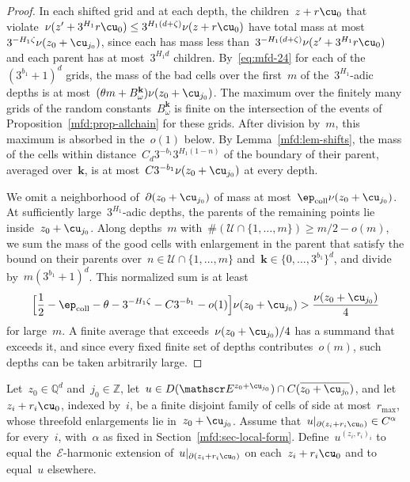 \documentclass[11pt]{amsart}
\begin{document}
\begin{proof}
In each shifted grid and at each depth, the children~$z+r\cu_0$ that violate~$\nu(z'+3^{H_1}r\cu_0)\leq3^{H_1(d+\zeta)}\nu(z+r\cu_0)$ have total mass at most~$3^{-H_1\zeta}\nu(z_0+\cu_{j_0})$, since each has mass less than~$3^{-H_1(d+\zeta)}\nu(z'+3^{H_1}r\cu_0)$ and each parent has at most~$3^{H_1d}$ children. By~\eqref{eq:mfd-24} for each of the~$(3^{b_1}+1)^d$ grids, the mass of the bad cells over the first~$m$ of the~$3^{H_1}$-adic depths is at most~$(\theta m+B_\omega^{\mathbf k})\nu(z_0+\cu_{j_0})$. The maximum over the finitely many grids of the random constants~$B^{\mathbf k}_\omega$ is finite on the intersection of the events of Proposition~\ref{mfd:prop-allchain} for these grids. After division by~$m$, this maximum is absorbed in the~$o(1)$ below. By Lemma~\ref{mfd:lem-shifts}, the mass of the cells within distance~$C_d3^{-b_1}3^{H_1(1-n)}$ of the boundary of their parent, averaged over~$\mathbf k$, is at most~$C3^{-b_1}\nu(z_0+\cu_{j_0})$ at every depth.

\smallskip

We omit a neighborhood of~$\partial(z_0+\cu_{j_0})$ of mass at most~$\ep_{\rm coll}\nu(z_0+\cu_{j_0})$. At sufficiently large~$3^{H_1}$-adic depths, the parents of the remaining points lie inside~$z_0+\cu_{j_0}$. Along depths~$m$ with~$\#(\mathcal U\cap\{1,\ldots,m\})\geq m/2-o(m)$, we sum the mass of the good cells with enlargement in the parent that satisfy the bound on their parents over~$n\in\mathcal U\cap\{1,\ldots,m\}$ and~$\mathbf k\in\{0,\ldots,3^{b_1}\}^d$, and divide by~$m(3^{b_1}+1)^d$. This normalized sum is at least
\begin{equation*}
	\Bigl[\frac12-\ep_{\rm coll}-\theta-3^{-H_1\zeta}-C3^{-b_1}
	-o(1)\Bigr]\nu(z_0+\cu_{j_0})>\frac{\nu(z_0+\cu_{j_0})}{4}
\end{equation*}
for large~$m$. A finite average that exceeds~$\nu(z_0+\cu_{j_0})/4$ has a summand that exceeds it, and since every fixed finite set of depths contributes~$o(m)$, such depths can be taken arbitrarily large.
\end{proof}

Let~$z_0\in\mathbb Q^d$ and~$j_0\in\mathbb Z$, let~$u\in D(\mathscr E^{z_0+\cu_{j_0}})\cap C(\overline{z_0+\cu_{j_0}})$, and let~$z_i+r_i\cu_0$, indexed by~$i$, be a finite disjoint family of cells of side at most~$r_{\max}$, whose threefold enlargements lie in~$z_0+\cu_{j_0}$. Assume that~$u|_{\partial(z_i+r_i\cu_0)}\in C^\alpha$ for every~$i$, with~$\alpha$ as fixed in Section~\ref{mfd:sec-local-form}. Define~$u^{(z_i,r_i)_i}$ to equal the~$\mathscr E$-harmonic extension of~$u|_{\partial(z_i+r_i\cu_0)}$ on each~$z_i+r_i\cu_0$ and to equal~$u$ elsewhere.
\end{document}
